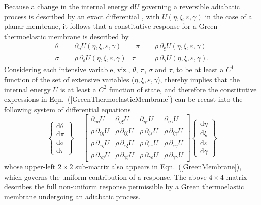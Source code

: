 Because a change in the internal energy $\mathrm{d} U$ governing a reversible adiabatic process is described by an exact differential \cite{Caratheodory09}, with $U( \eta, \xi, \varepsilon, \gamma )$ in the case of a planar membrane, it follows that a constitutive response for a Green thermo\-elastic membrane is described by
\begin{equation}
    \begin{aligned}
    \theta & = \partial_{\eta} U(\eta, \xi, \varepsilon, \gamma) &
    \phantom{\rho}
    \pi & = \rho \, \partial_{\xi} U(\eta, \xi, \varepsilon, \gamma)  \\
    \sigma & = \rho \, \partial_{\varepsilon} U(\eta, \xi, \varepsilon, \gamma) &
    \tau & = \rho \, \partial_{\gamma} U(\eta, \xi, \varepsilon, \gamma) .
    \end{aligned}
    \label{GreenThermoelasticMembrane}
\end{equation}
Considering each intensive variable, viz., $\theta$, $\pi$, $\sigma$ and $\tau$, to be at least a $C^1$ function of the set of extensive variables ($\eta , \xi , \varepsilon , \gamma$), thereby implies that the internal energy $U$ is at least a $C^2$ function of state, and therefore the constitutive expressions in Eqn.~(\ref{GreenThermoelasticMembrane}) can be recast into the following system of differential equations
\begin{equation}
\label{energies2D}
\left\{ \begin{matrix}
\mathrm{d} \theta \\ \mathrm{d} \pi \\
\mathrm{d} \sigma \\ \mathrm{d} \tau
\end{matrix} \right\} = \begin{bmatrix}
\partial_{\eta\eta} U & 
\partial_{\eta\xi} U & 
\partial_{\eta\varepsilon} U & 
\partial_{\eta\gamma} U \\ 
\rho \, \partial_{\xi\eta} U & 
\rho \, \partial_{\xi\xi} U & 
\rho \, \partial_{\xi\varepsilon} U &
\rho \, \partial_{\xi\gamma} U \\
\rho \, \partial_{\varepsilon\eta} U & 
\rho \, \partial_{\varepsilon\xi} U & 
\rho \, \partial_{\varepsilon\varepsilon} U & 
\rho \, \partial_{\varepsilon\gamma} U \\
\rho \, \partial_{\gamma\eta} U & 
\rho \, \partial_{\gamma\xi} U & 
\rho \, \partial_{\gamma\varepsilon} U & 
\rho \, \partial_{\gamma\gamma} U 
\end{bmatrix} 
\left\{ \begin{matrix}
\mathrm{d}\eta \\ \mathrm{d} \xi \\
\mathrm{d} \varepsilon \\ \mathrm{d} \gamma
\end{matrix} \right\}  
\end{equation}
whose upper-left $2\times 2$ sub-matrix also appears in Eqn.~(\ref{GreenMembrane}), which governs the uniform contribution of a response.  The above $4 \times 4$ matrix describes the full non-uniform response permissible by a Green thermo\-elastic membrane undergoing an adiabatic process.

